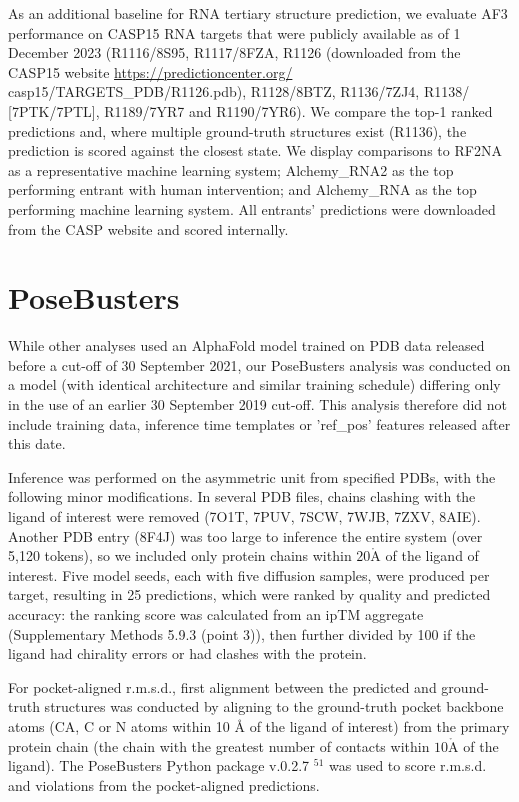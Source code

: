 \documentclass[10pt]{article}
\def\AA{\mathring{\mathrm{A}}}
\begin{document}
As an additional baseline for RNA tertiary structure prediction, we evaluate AF3 performance on CASP15 RNA targets that were publicly available as of 1 December 2023 (R1116/8S95, R1117/8FZA, R1126 (downloaded from the CASP15 website \href{https://predictioncenter.org/}{https://predictioncenter.org/} casp15/TARGETS\_PDB/R1126.pdb), R1128/8BTZ, R1136/7ZJ4, R1138/ [7PTK/7PTL], R1189/7YR7 and R1190/7YR6). We compare the top-1 ranked predictions and, where multiple ground-truth structures exist (R1136), the prediction is scored against the closest state. We display comparisons to RF2NA as a representative machine learning system; Alchemy\_RNA2 as the top performing entrant with human intervention; and Alchemy\_RNA as the top performing machine learning system. All entrants' predictions were downloaded from the CASP website and scored internally.

\section*{PoseBusters}
While other analyses used an AlphaFold model trained on PDB data released before a cut-off of 30 September 2021, our PoseBusters analysis was conducted on a model (with identical architecture and similar training schedule) differing only in the use of an earlier 30 September 2019 cut-off. This analysis therefore did not include training data, inference time templates or 'ref\_pos' features released after this date.

Inference was performed on the asymmetric unit from specified PDBs, with the following minor modifications. In several PDB files, chains clashing with the ligand of interest were removed (7O1T, 7PUV, 7SCW, 7WJB, 7ZXV, 8AIE). Another PDB entry (8F4J) was too large to inference the entire system (over 5,120 tokens), so we included only protein chains within $20 \AA$ of the ligand of interest. Five model seeds, each with five diffusion samples, were produced per target, resulting in 25 predictions, which were ranked by quality and predicted accuracy: the ranking score was calculated from an ipTM aggregate (Supplementary Methods 5.9.3 (point 3)), then further divided by 100 if the ligand had chirality errors or had clashes with the protein.

For pocket-aligned r.m.s.d., first alignment between the predicted and ground-truth structures was conducted by aligning to the ground-truth pocket backbone atoms (CA, C or N atoms within 10 Å of the ligand of interest) from the primary protein chain (the chain with the greatest number of contacts within $10 \AA$ of the ligand). The PoseBusters Python package v.0.2.7 ${ }^{51}$ was used to score r.m.s.d. and violations from the pocket-aligned predictions.
\end{document}
